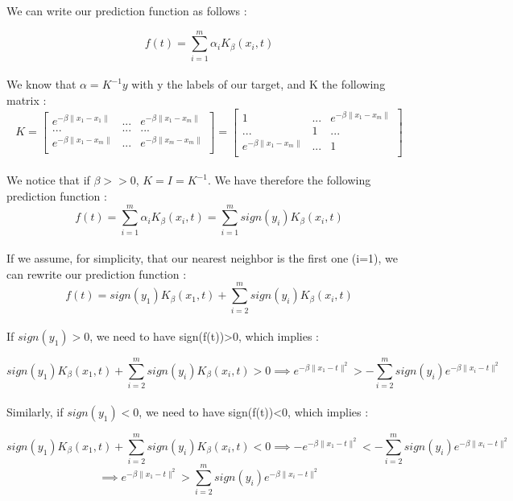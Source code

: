 \documentclass[final,3p,times,12pt]{article}
\begin{document}
\begin{enumerate}
    We can write our prediction function as follows :

\[
f(t) = \sum_{i=1}^m \alpha_iK_{\beta}(x_i,t)
\]\\

We know that $\alpha = K^{-1}y$ with y the labels of our target, and K the following matrix : \[
K = \begin{bmatrix}
  e^{-\beta \lVert x_1 - x_1 \rVert} & ... & e^{-\beta \lVert x_1 - x_m \rVert} \\
  ... & ... & ... \\
  e^{-\beta \lVert x_1 - x_m \rVert} & ... & e^{-\beta \lVert x_m - x_m \rVert} \\
\end{bmatrix} = \begin{bmatrix}
  1 & ... & e^{-\beta \lVert x_1 - x_m \rVert} \\
  ... & 1 & ... \\
  e^{-\beta \lVert x_1 - x_m \rVert} & ... & 1 \\
\end{bmatrix}
\]\\

We notice that if $\beta >> 0$, $K = I = K^{-1}$. We have therefore the following prediction function : \\

\[
f(t) = \sum_{i=1}^m \alpha_iK_{\beta}(x_i,t) = \sum_{i=1}^m sign(y_i)K_{\beta}(x_i,t)
\]\\

If we assume, for simplicity, that our nearest neighbor is the first one (i=1), we can rewrite our prediction function : \\

\[
f(t) = sign(y_1)K_{\beta}(x_1,t) + \sum_{i=2}^m sign(y_i)K_{\beta}(x_i,t)
\]\\

If $sign(y_1)>0$, we need to have sign(f(t))>0, which implies : 

\[
sign(y_1)K_{\beta}(x_1,t) + \sum_{i=2}^m sign(y_i)K_{\beta}(x_i,t) > 0 \implies e^{-\beta\lVert x_1-t \rVert^{2}} > -\sum_{i=2}^m sign(y_i)e^{-\beta \lVert x_i-t \rVert^{2}}
\]\\

Similarly, if $sign(y_1)<0$, we need to have sign(f(t))<0, which implies : 

\[
sign(y_1)K_{\beta}(x_1,t) + \sum_{i=2}^m sign(y_i)K_{\beta}(x_i,t) < 0 \implies -e^{-\beta\lVert x_1-t \rVert^{2}} < -\sum_{i=2}^m sign(y_i)e^{-\beta \lVert x_i-t \rVert^{2}}
\]
\[ \implies e^{-\beta\lVert x_1-t \rVert^{2}} > \sum_{i=2}^m sign(y_i)e^{-\beta \lVert x_i-t \rVert^{2}}
\]\\


\end{enumerate}
\end{document}
